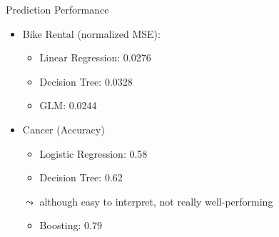 \documentclass[aspectratio=169]{../latex_main/tntbeamer}  %
\begin{document}
	\begin{frame}{Prediction Performance}
        
        \begin{itemize}
            \item Bike Rental (normalized MSE):
            \begin{itemize}
                \item Linear Regression: 0.0276
                \item Decision Tree: 0.0328
                \item GLM: 0.0244
            \end{itemize}
            \pause
            \medskip
            \item Cancer (Accuracy)
            \begin{itemize}
                \item Logistic Regression: 0.58
                \item Decision Tree: 0.62
            \end{itemize}
            \pause
            \smallskip
            \item[$\leadsto$] although easy to interpret, not really well-performing 
            \begin{itemize}
                \item Boosting: 0.79
            \end{itemize}
        \end{itemize}
        
    \end{frame}
	
\end{document}
